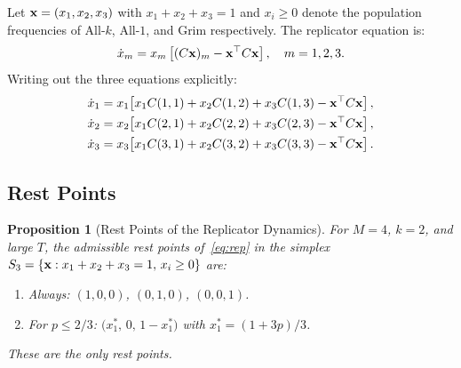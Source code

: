 \documentclass[12pt,a4paper]{article}
\newtheorem{proposition}{Proposition}[section]
\begin{document}
Let ${\bf x}=(x_1,x_2,x_3)$ with $x_1+x_2+x_3=1$ and $x_i\geq 0$ denote
the population frequencies of All-$k$, All-$1$, and Grim respectively.
The replicator equation is:
\begin{equation}\label{eq:rep}
  \dot{x}_m = x_m\left[(C{\bf x})_m - {\bf x}^\top C{\bf x}\right], \quad m=1,2,3.
\end{equation}
Writing out the three equations explicitly:
\begin{align*}
\dot{x}_1 &= x_1\!\left[x_1 C(1,1)+x_2 C(1,2)+x_3 C(1,3) - {\bf x}^\top C{\bf x}\right],\\
\dot{x}_2 &= x_2\!\left[x_1 C(2,1)+x_2 C(2,2)+x_3 C(2,3) - {\bf x}^\top C{\bf x}\right],\\
\dot{x}_3 &= x_3\!\left[x_1 C(3,1)+x_2 C(3,2)+x_3 C(3,3) - {\bf x}^\top C{\bf x}\right].
\end{align*}

\subsection{Rest Points}

\begin{proposition}[Rest Points of the Replicator Dynamics]\label{prop:restpoints}
For $M=4$, $k=2$, and large $T$, the admissible rest points of~\eqref{eq:rep}
in the simplex $S_3=\{{\bf x}:x_1+x_2+x_3=1,\,x_i\geq 0\}$ are:
\begin{enumerate}
  \item Always: $(1,0,0)$, $(0,1,0)$, $(0,0,1)$.
  \item For $p\leq 2/3$: $\bigl(x_1^*,\,0,\,1-x_1^*\bigr)$ with $x_1^*=(1+3p)/3$.
\end{enumerate}
These are the only rest points.
\end{proposition}
\end{document}
